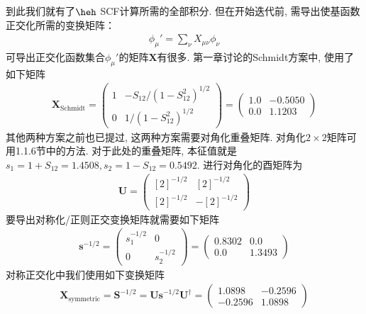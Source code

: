 到此我们就有了$\heh$ SCF计算所需的全部积分. 但在开始迭代前, 需导出使基函数正交化所需的变换矩阵：
\begin{align}
\phi_\mu'=\sum_\nu X_{\mu\nu}\phi_\nu
\end{align}
可导出正交化函数集合$\phi_\mu'$的矩阵$\mathbf{X}$有很多. 第一章讨论的Schmidt方案中, 使用了如下矩阵
\begin{align}
\mathbf{X}_\mathrm{Schmidt} = 
\begin{pmatrix}
1&-S_{12}/(1-S_{12}^2)^{1/2}\\
0&1/(1-S_{12}^2)^{1/2}
\end{pmatrix}=
\begin{pmatrix}
1.0&-0.5050\\0.0&1.1203
\end{pmatrix}
\end{align}
其他两种方案之前也已提过, 这两种方案需要对角化重叠矩阵. 对角化$2\times2$矩阵可用1.1.6节中的方法. 对于此处的重叠矩阵, 本征值就是$s_1=1+S_{12}=1.4508,s_2=1-S_{12}=0.5492$. 进行对角化的酉矩阵为
\begin{align}
\mathbf{U}=
\begin{pmatrix}
[2]^{-1/2}&[2]^{-1/2}\\
[2]^{-1/2}&-[2]^{-1/2}
\end{pmatrix}
\end{align}
要导出对称化/正则正交变换矩阵就需要如下矩阵
\begin{align}
\mathbf{s}^{-1/2}=
\begin{pmatrix}
s_1^{-1/2}&0\\0&s_2^{-1/2}
\end{pmatrix}=
\begin{pmatrix}
0.8302&0.0\\0.0&1.3493
\end{pmatrix}
\end{align}
对称正交化中我们使用如下变换矩阵
\begin{align}
\mathbf{X}_\mathrm{symmetric} = \mathbf{S}^{-1/2}=\mathbf{Us}^{-1/2}\mathbf{U^\dagger}=
\begin{pmatrix}
1.0898&-0.2596\\-0.2596&1.0898
\end{pmatrix}
\end{align}

